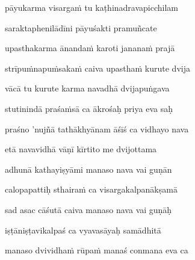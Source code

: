 
pāyukarma visarga\.m tu kaṭhinadravapicchilam\thinspace{\dandab} \dontdisplaylinenum

saraktaphenilādīni pāyuśakti pramuñcate \veg\dontdisplaylinenum



upasthakarma ānanda\.m karoti janana\.m prajā\thinspace{\dandab} \dontdisplaylinenum

strīpu\.mnapu\.msaka\.m caiva upastha\.m kurute dvija \veg\dontdisplaylinenum



vācā tu kurute karma navadhā dvijapuṅgava\thinspace{\dandab} \dontdisplaylinenum

stutinindā praśa\.msā ca ākrośaḥ priya eva saḥ \veg\dontdisplaylinenum

praśno 'nujñā tathākhyānam āśīś ca vidhayo nava\thinspace{\dandab} \dontdisplaylinenum

etā navavidhā vāṇī kīrtito me dvijottama \veg\dontdisplaylinenum


adhunā kathayiṣyāmi manaso nava vai guṇān\thinspace{\dandab} \dontdisplaylinenum

calopapattiḥ sthaira\.m ca visargakalpanākṣamā \veg\dontdisplaylinenum

sad asac cāśutā caiva manaso nava vai guṇāḥ\thinspace{\dandab} \dontdisplaylinenum

iṣṭāniṣṭavikalpaś ca vyavasāyaḥ samādhitā \veg\dontdisplaylinenum

manaso dvividha\.m rūpa\.m manaś conmana eva ca\thinspace{\dandab} \dontdisplaylinenum

